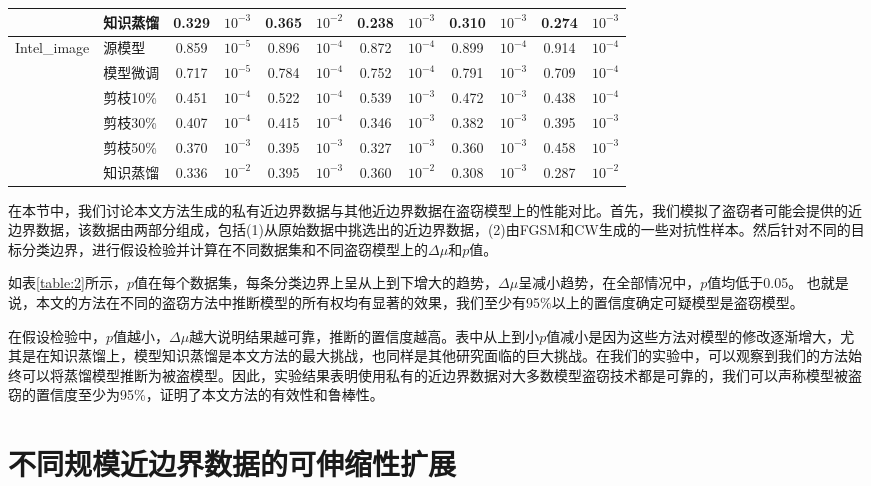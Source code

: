 \begin{table}[H]
{\begin{tabular}{l l c c c c c c c c c c}
								&知识蒸馏  & 0.329 & $10^{-3}$ & 0.365 & $10^{-2}$ & 0.238 & $10^{-3}$ & 0.310 & $10^{-3}$ & 0.274 & $10^{-3}$   \\
		\hline
\multirow{6}{5em}{Intel\_image} &源模型    & 0.859 & $10^{-5}$ & 0.896 & $10^{-4}$ & 0.872 & $10^{-4}$ & 0.899 & $10^{-4}$ & 0.914 & $10^{-4}$   \\
								&模型微调  & 0.717 & $10^{-5}$ & 0.784 & $10^{-4}$ & 0.752 & $10^{-4}$ & 0.791 & $10^{-3}$ & 0.709 & $10^{-4}$   \\
								&剪枝10\%  & 0.451 & $10^{-4}$ & 0.522 & $10^{-4}$ & 0.539 & $10^{-3}$ & 0.472 & $10^{-3}$ & 0.438 & $10^{-4}$   \\
								&剪枝30\%  & 0.407 & $10^{-4}$ & 0.415 & $10^{-4}$ & 0.346 & $10^{-3}$ & 0.382 & $10^{-3}$ & 0.395 & $10^{-3}$   \\
								&剪枝50\%  & 0.370 & $10^{-3}$ & 0.395 & $10^{-3}$ & 0.327 & $10^{-3}$ & 0.360 & $10^{-3}$ & 0.458 & $10^{-3}$   \\
								&知识蒸馏  & 0.336 & $10^{-2}$ & 0.395 & $10^{-3}$ & 0.360 & $10^{-2}$ & 0.308 & $10^{-3}$ & 0.287 & $10^{-2}$   \\
		\hline		
	\end{tabular}
}
\end{table}

在本节中，我们讨论本文方法生成的私有近边界数据与其他近边界数据在盗窃模型上的性能对比。首先，我们模拟了盗窃者可能会提供的近边界数据，该数据由两部分组成，包括(1)从原始数据中挑选出的近边界数据，(2)由FGSM和CW生成的一些对抗性样本。然后针对不同的目标分类边界，进行假设检验并计算在不同数据集和不同盗窃模型上的$\Delta\mu$和$p$值。

如表\ref{table:2}所示，$p$值在每个数据集，每条分类边界上呈从上到下增大的趋势，$\Delta\mu$呈减小趋势，在全部情况中，$p$值均低于0.05。
也就是说，本文的方法在不同的盗窃方法中推断模型的所有权均有显著的效果，我们至少有95\%以上的置信度确定可疑模型是盗窃模型。

在假设检验中，$p$值越小，$\Delta\mu$越大说明结果越可靠，推断的置信度越高。表中从上到小$p$值减小是因为这些方法对模型的修改逐渐增大，尤其是在知识蒸馏上，模型知识蒸馏是本文方法的最大挑战，也同样是其他研究面临的巨大挑战。在我们的实验中，可以观察到我们的方法始终可以将蒸馏模型推断为被盗模型。因此，实验结果表明使用私有的近边界数据对大多数模型盗窃技术都是可靠的，我们可以声称模型被盗窃的置信度至少为95\%，证明了本文方法的有效性和鲁棒性。


\section{不同规模近边界数据的可伸缩性扩展}\label{5.6}

